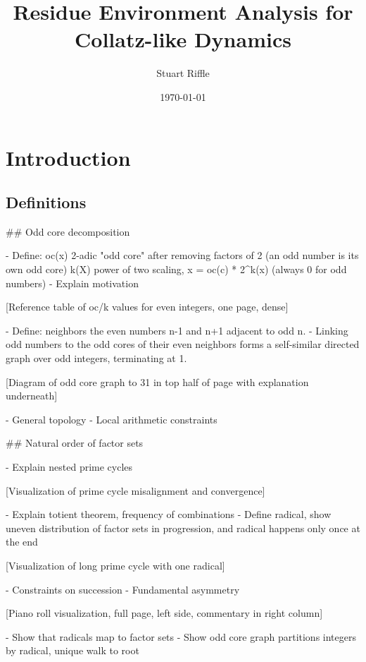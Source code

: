 \documentclass[12pt]{article}
\title{Residue Environment Analysis for Collatz-like Dynamics}
\author{Stuart Riffle}
\date{\today}
\theoremstyle{plain}
\theoremstyle{definition}
\begin{document}
\maketitle
\begin{abstract}
\end{abstract}

\section{Introduction}
    \subsection{Definitions}





## Odd core decomposition

- Define:
    oc(x)   2-adic "odd core" after removing factors of 2 (an odd number is its own odd core)
    k(X)    power of two scaling, x = oc(c) * 2^k(x) (always 0 for odd numbers)
- Explain motivation

[Reference table of oc/k values for even integers, one page, dense]

- Define:
  neighbors   the even numbers n-1 and n+1 adjacent to odd n.
- Linking odd numbers to the odd cores of their even neighbors forms a self-similar directed graph over odd integers, terminating at 1.

[Diagram of odd core graph to 31 in top half of page with explanation underneath]

- General topology
- Local arithmetic constraints

## Natural order of factor sets

- Explain nested prime cycles

[Visualization of prime cycle misalignment and convergence]

- Explain totient theorem, frequency of combinations
- Define radical, show uneven distribution of factor sets in progression, and radical happens only once at the end

[Visualization of long prime cycle with one radical]

- Constraints on succession
- Fundamental asymmetry

[Piano roll visualization, full page, left side, commentary in right column]

- Show that radicals map to factor sets
- Show odd core graph partitions integers by radical, unique walk to root
\end{document}
